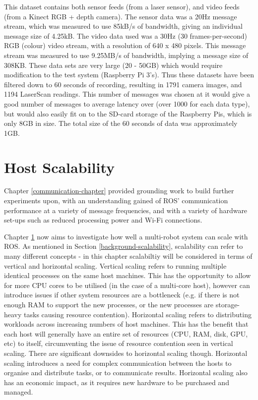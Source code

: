 \documentclass{l4proj}
\begin{document}
This dataset contains both sensor feeds (from a laser sensor), and video feeds (from a Kinect RGB + depth camera). The sensor data was a 20Hz message stream, which was measured to use 85kB/s of bandwidth, giving an individual message size of 4.25kB. The video data used was a 30Hz (30 frames-per-second) RGB (colour) video stream, with a resolution of 640 x 480 pixels. This message stream was measured to use 9.25MB/s of bandwidth, implying a message size of 308KB. These data sets are very large (20 - 50GB) which would require modification to the test system (Raspberry Pi 3’s). Thus these datasets have been filtered down to 60 seconds of recording, resulting in 1791 camera images, and 1194 LaserScan readings. This number of messages was chosen at it would give a good number of messages to average latency over (over 1000 for each data type), but would also easily fit on to the SD-card storage of the Raspberry Pis, which is only 8GB in size. The total size of the 60 seconds of data was approximately 1GB.





\chapter{Host Scalability}
\label{host-scalability-chapter}

Chapter \ref{communication-chapter} provided grounding work to build further experiments upon, with an understanding gained of ROS' communication performance at a variety of message frequencies, and with a variety of hardware set-ups such as reduced processing power and Wi-Fi connections.

Chapter \ref{host-scalability-chapter} now aims to investigate how well a multi-robot system can scale with ROS. As mentioned in Section \ref{background-scalability}, scalability can refer to many different concepts - in this chapter scalabiltiy will be considered in terms of vertical and horizontal scaling. Vertical scaling refers to running multiple identical processes on the same host machines. This has the opportunity to allow for more CPU cores to be utilised (in the case of a multi-core host), however can introduce issues if other system resources are a bottleneck (e.g. if there is not enough RAM to support the new processes, or the new processes are storage-heavy tasks causing resource contention). Horizontal scaling refers to distributing workloads across increasing numbers of host machines. This has the benefit that each host will generally have an entire set of resources (CPU, RAM, disk, GPU, etc) to itself, circumventing the issue of resource contention seen in vertical scaling. There are significant downsides to horizontal scaling though. Horizontal scaling introduces a need for complex communication between the hosts to organise and distribute tasks, or to communicate results. Horizontal scaling also has an economic impact, as it requires new hardware to be purchased and managed.
\end{document}
